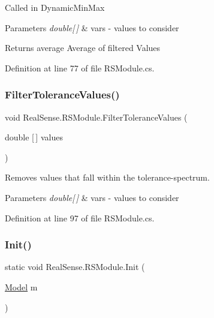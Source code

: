 Called in Dynamic\+Min\+Max 
\begin{DoxyParams}{Parameters}
{\em double\mbox{[}$\,$\mbox{]}} & vars -\/ values to consider \\
\hline
\end{DoxyParams}
\begin{DoxyReturn}{Returns}
average Average of filtered Values 
\end{DoxyReturn}


Definition at line 77 of file R\+S\+Module.\+cs.

\mbox{\label{class_real_sense_1_1_r_s_module_a4294c740efc99c4f5c4034e812f1bdaa}} 
\subsubsection{\texorpdfstring{Filter\+Tolerance\+Values()}{FilterToleranceValues()}}
{\footnotesize\ttfamily void Real\+Sense.\+R\+S\+Module.\+Filter\+Tolerance\+Values (\begin{DoxyParamCaption}\item[{double \mbox{[}$\,$\mbox{]}}]{values }\end{DoxyParamCaption})\hspace{0.3cm}{\ttfamily [protected]}}

Removes values that fall within the tolerance-\/spectrum. 
\begin{DoxyParams}{Parameters}
{\em double\mbox{[}$\,$\mbox{]}} & vars -\/ values to consider \\
\hline
\end{DoxyParams}


Definition at line 97 of file R\+S\+Module.\+cs.

\mbox{\label{class_real_sense_1_1_r_s_module_a4a96119975932690f75e86206e1fe63d}} 
\subsubsection{\texorpdfstring{Init()}{Init()}}
{\footnotesize\ttfamily static void Real\+Sense.\+R\+S\+Module.\+Init (\begin{DoxyParamCaption}\item[{\hyperlink{class_real_sense_1_1_model}{Model}}]{m }\end{DoxyParamCaption})\hspace{0.3cm}{\ttfamily [static]}}

